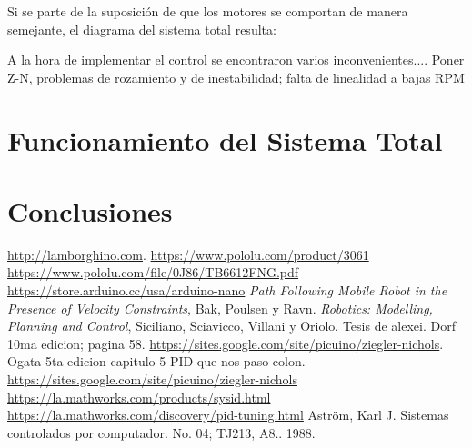 \documentclass[10pt,conference,a4paper,onecolumn]{article}%
\begin{document}
Si se parte de la suposición de que los motores se comportan de manera semejante, el diagrama del sistema total resulta:



A la hora de implementar el control se encontraron varios inconvenientes.... Poner Z-N, problemas de rozamiento y de inestabilidad; falta de linealidad a bajas RPM

\section{Funcionamiento del Sistema Total}
\label{sec:resultados}
\section{Conclusiones}
\label{sec:conclusiones}

\begin{thebibliography}{X}
 \url{http://lamborghino.com}. 
\url{https://www.pololu.com/product/3061}
\url{ https://www.pololu.com/file/0J86/TB6612FNG.pdf}
 \url{https://store.arduino.cc/usa/arduino-nano}
 \textit{Path Following Mobile Robot in the Presence of Velocity Constraints}, Bak, Poulsen y Ravn.
 \textit{Robotics: Modelling, Planning and Control}, Siciliano, Sciavicco, Villani y Oriolo.
 Tesis de alexei.
 Dorf 10ma edicion; pagina 58.
 \url{https://sites.google.com/site/picuino/ziegler-nichols}.
 Ogata 5ta edicion capitulo 5
 PID que nos paso colon.
\url{https://sites.google.com/site/picuino/ziegler-nichols}
\url{https://la.mathworks.com/products/sysid.html}
\url{https://la.mathworks.com/discovery/pid-tuning.html}
 Aström, Karl J. Sistemas controlados por computador. No. 04; TJ213, A8.. 1988.
\end{thebibliography}
\end{document}

